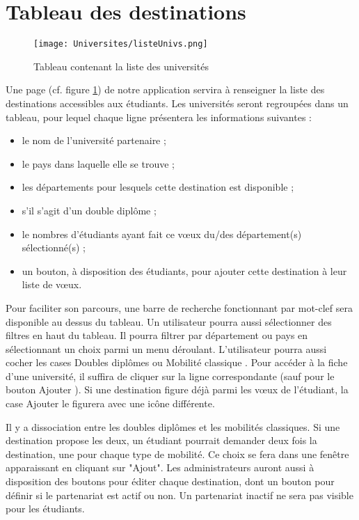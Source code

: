 \section{Tableau des destinations}
\label{sec::list_univ}

\begin{figure}[h!]
	\centering
	\texttt{[image: Universites/listeUnivs.png]}
	\caption{Tableau contenant la liste des universités}
	\label{fig::list_uni}
\end{figure}



Une page (cf. figure \ref{fig::list_uni}) de notre application servira à renseigner la liste des destinations accessibles aux étudiants.
Les universités seront regroupées dans un tableau, pour lequel chaque ligne présentera les informations suivantes :
 \begin{itemize}
 	\item le nom de l'université partenaire ;
 	\item le pays dans laquelle elle se trouve ;
 	\item les départements pour lesquels cette destination est disponible ;
 	\item s'il s'agit d'un double diplôme ;
 	\item le nombres d'étudiants ayant fait ce vœux du/des département(s) sélectionné(s) ;
 	\item un bouton, à disposition des étudiants, pour ajouter cette destination à leur liste de vœux.
 \end{itemize}
 
Pour faciliter son parcours, une barre de recherche fonctionnant par mot-clef sera disponible au dessus du tableau. Un utilisateur pourra aussi sélectionner des filtres en haut du tableau. Il pourra filtrer par département ou pays en sélectionnant un choix parmi un menu déroulant. L'utilisateur pourra aussi cocher les cases \og Doubles diplômes\fg{} ou \og Mobilité classique \fg{}. Pour accéder à la fiche d'une université, il suffira de cliquer sur la ligne correspondante (sauf pour le bouton \og Ajouter \fg{}). Si une destination figure déjà parmi les vœux de l'étudiant, la case \og Ajouter \fg{} le figurera avec une icône différente.
\bigbreak

Il y a dissociation entre les doubles diplômes et les mobilités classiques. Si une destination propose les deux, un étudiant pourrait demander deux fois la destination, une pour chaque type de mobilité. Ce choix se fera dans une fenêtre apparaissant en cliquant sur "Ajout". 
Les administrateurs auront aussi à disposition des boutons pour éditer chaque destination, dont un bouton pour définir si le partenariat est actif ou non. Un partenariat inactif ne sera pas visible pour les étudiants.
\bigbreak


